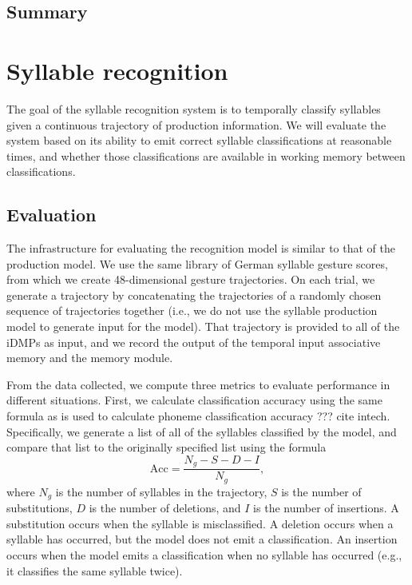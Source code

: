 \subsection{Summary}


\section{Syllable recognition}

The goal of the syllable recognition system
is to temporally classify syllables
given a continuous trajectory
of production information.
We will evaluate the system
based on its ability to emit
correct syllable classifications
at reasonable times,
and whether those classifications
are available in working memory
between classifications.

\subsection{Evaluation}

The infrastructure for evaluating
the recognition model
is similar to that of the production model.
We use the same library
of German syllable gesture scores,
from which we create
48-dimensional gesture trajectories.
On each trial,
we generate a trajectory
by concatenating the trajectories
of a randomly chosen sequence
of trajectories together
(i.e., we do not use the
syllable production model
to generate input for the model).
That trajectory is provided
to all of the iDMPs as input,
and we record the output of the
temporal input associative memory
and the memory module.

From the data collected,
we compute three metrics
to evaluate performance
in different situations.
First, we calculate
classification accuracy
using the same formula
as is used to calculate
phoneme classification accuracy ??? cite intech.
Specifically,
we generate a list of all of the
syllables classified by the model,
and compare that list to the
originally specified list
using the formula
\begin{equation}
  \text{Acc} = \frac{N_g - S - D - I}{N_g},
\end{equation}
where $N_g$ is the number of syllables
in the trajectory,
$S$ is the number of substitutions,
$D$ is the number of deletions,
and $I$ is the number of insertions.
A substitution occurs when
the syllable is misclassified.
A deletion occurs when
a syllable has occurred,
but the model does not emit a classification.
An insertion occurs
when the model emits a classification
when no syllable has occurred
(e.g., it classifies the same syllable twice).

